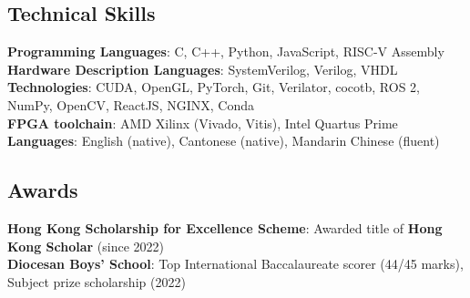 \documentclass[a4paper,11pt]{article}
\begin{document}
\subsection*{\normalsize Technical Skills}
\begin{itemize}[leftmargin=0.15in, label={}]
    \small{\item{
    \textbf{Programming Languages}{: C, C++, Python, JavaScript, RISC-V Assembly} \\
    \textbf{Hardware Description Languages}{: SystemVerilog, Verilog, VHDL} \\
    \textbf{Technologies}{: CUDA, OpenGL, PyTorch, Git, Verilator, cocotb, ROS 2, NumPy, OpenCV, ReactJS, NGINX, Conda} \\
    \textbf{FPGA toolchain}{: AMD Xilinx (Vivado, Vitis), Intel Quartus Prime} \\
    \textbf{Languages}{: English (native), Cantonese (native), Mandarin Chinese (fluent)}
    }}
\end{itemize}

\subsection*{\normalsize Awards}
\begin{itemize}[leftmargin=0.15in, label={}]
    \small{\item{
    \textbf{Hong Kong Scholarship for Excellence Scheme}{: Awarded title of \textbf{Hong Kong Scholar} (since 2022)} \\
    \textbf{Diocesan Boys' School}{: Top International Baccalaureate scorer (44/45 marks), Subject prize scholarship (2022)} \\
    }}
\end{itemize}
\end{document}
